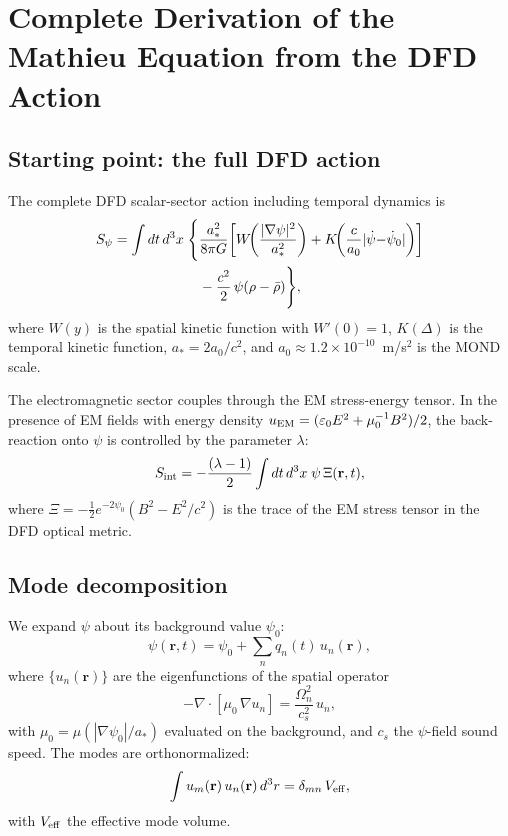 \documentclass[12pt,aps,prd,twocolumn,superscriptaddress,nofootinbib]{revtex4-2}
\newcommand{\half}{\tfrac{1}{2}}
\newcommand{\br}{\mathbf{r}}
\begin{document}
\section{Complete Derivation of the Mathieu Equation from the DFD Action}
\label{sec:mathieu}

\subsection{Starting point: the full DFD action}

The complete DFD scalar-sector action including temporal dynamics is
\begin{align}
S_\psi = \int dt\,d^3x\;\Biggl\{
  &\frac{a_*^2}{8\pi G}\biggl[
    W\!\biggl(\frac{|\nabla\psi|^2}{a_*^2}\biggr)
    + K\!\biggl(\frac{c}{a_0}|\dot\psi{-}\dot\psi_0|\biggr)
  \biggr] \notag\\
  &- \frac{c^2}{2}\,\psi(\rho - \bar\rho)
\Biggr\},
\label{eq:full_action}
\end{align}
where $W(y)$ is the spatial kinetic function with $W'(0)=1$,
$K(\Delta)$ is the temporal kinetic function, $a_* = 2a_0/c^2$,
and $a_0 \approx 1.2\times10^{-10}$~m/s$^2$ is the MOND scale.

The electromagnetic sector couples through the EM stress-energy
tensor.  In the presence of EM fields with energy density
$u_{\rm EM} = (\varepsilon_0 E^2 + \mu_0^{-1}B^2)/2$, the
back-reaction onto $\psi$ is controlled by the parameter $\lambda$:
\begin{equation}
S_{\rm int} = -\frac{(\lambda-1)}{2}\int dt\,d^3x\;\psi\,
\Xi(\br,t),
\label{eq:interaction}
\end{equation}
where $\Xi = -\half e^{-2\psi_0}(B^2 - E^2/c^2)$ is the trace of
the EM stress tensor in the DFD optical metric.

\subsection{Mode decomposition}

We expand $\psi$ about its background value $\psi_0$:
\begin{equation}
\psi(\br,t) = \psi_0 + \sum_n q_n(t)\,u_n(\br),
\label{eq:mode_expansion}
\end{equation}
where $\{u_n(\br)\}$ are the eigenfunctions of the spatial operator
\begin{equation}
-\nabla\cdot[\mu_0\,\nabla u_n] = \frac{\Omega_n^2}{c_s^2}\,u_n,
\label{eq:eigenvalue}
\end{equation}
with $\mu_0 = \mu(|\nabla\psi_0|/a_*)$ evaluated on the background,
and $c_s$ the $\psi$-field sound speed.  The modes are orthonormalized:
\begin{equation}
\int u_m(\br)\,u_n(\br)\,d^3r = \delta_{mn}\,V_{\rm eff},
\label{eq:orthonorm}
\end{equation}
with $V_{\rm eff}$ the effective mode volume.
\end{document}
